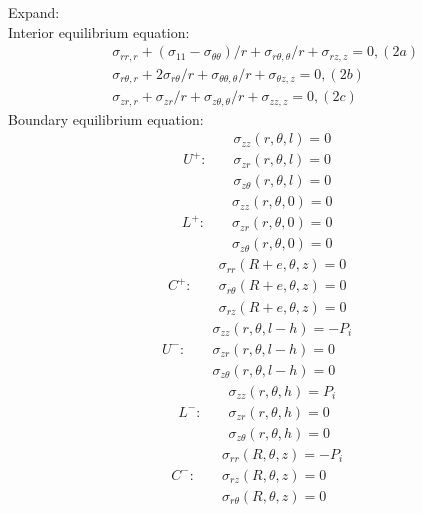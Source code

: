 \documentclass[letter,12pt]{article}
\begin{document}
Expand: \\
Interior equilibrium equation:
\begin{equation}
\begin{aligned}
& \sigma_{rr,r}+(\sigma_{11}-\sigma_{\theta \theta})/r +\sigma_{r\theta,\theta}/r +\sigma_{rz,z}=0, (2a) \\
& \sigma_{r\theta,r}+ 2\sigma_{r\theta}/r+ \sigma_{\theta \theta,\theta}/r +\sigma_{\theta z,z}=0, (2b) \\
& \sigma_{zr,r}+ \sigma_{zr}/r+ \sigma_{z\theta,\theta}/r+ \sigma_{zz,z}=0, (2c)
\end{aligned}
\end{equation}
Boundary equilibrium equation: 
\begin{equation}
U^{+}: \text{	}
\begin{aligned}
&\sigma_{zz}(r,\theta,l)=0\\
&\sigma_{zr}(r,\theta,l)=0\\
&\sigma_{z\theta}(r,\theta,l)=0
\end{aligned}
\end{equation}
\begin{equation}
L^{+}: \text{	}
\begin{aligned}
&\sigma_{zz}(r,\theta,0)=0\\
&\sigma_{zr}(r,\theta,0)=0\\
&\sigma_{z\theta}(r,\theta,0)=0
\end{aligned}
\end{equation}
\begin{equation}
C^{+}: \text{	}
\begin{aligned}
&\sigma_{rr}(R+e,\theta,z)=0\\
&\sigma_{r\theta}(R+e,\theta,z)=0\\
&\sigma_{rz}(R+e,\theta,z)=0
\end{aligned}
\end{equation}
\begin{equation}
U^{-}: \text{	}
\begin{aligned}
&\sigma_{zz}(r,\theta,l-h)=-P_i\\
&\sigma_{zr}(r,\theta,l-h)=0\\
&\sigma_{z\theta}(r,\theta,l-h)=0
\end{aligned}
\end{equation}
\begin{equation}
L^{-}: \text{	}
\begin{aligned}
&\sigma_{zz}(r,\theta,h)=P_i\\
&\sigma_{zr}(r,\theta,h)=0\\
&\sigma_{z\theta}(r,\theta,h)=0
\end{aligned}
\end{equation}
\begin{equation}
C^{-}: \text{	}
\begin{aligned}
&\sigma_{rr}(R,\theta,z)=-P_i\\
&\sigma_{rz}(R,\theta,z)=0\\
&\sigma_{r\theta}(R,\theta,z)=0
\end{aligned}
\end{equation}
\\ 
\end{document}
